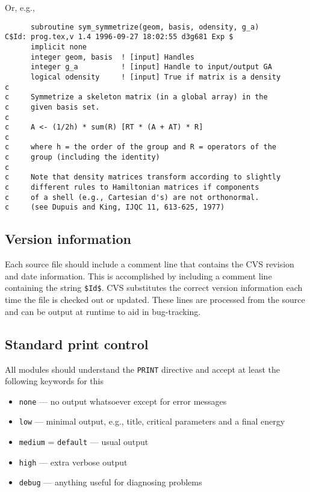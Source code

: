 Or, e.g.,
\begin{verbatim}
      subroutine sym_symmetrize(geom, basis, odensity, g_a)
C$Id: prog.tex,v 1.4 1996-09-27 18:02:55 d3g681 Exp $
      implicit none
      integer geom, basis  ! [input] Handles
      integer g_a          ! [input] Handle to input/output GA
      logical odensity     ! [input] True if matrix is a density
c
c     Symmetrize a skeleton matrix (in a global array) in the
c     given basis set.
c
c     A <- (1/2h) * sum(R) [RT * (A + AT) * R]
c
c     where h = the order of the group and R = operators of the
c     group (including the identity)
c
c     Note that density matrices transform according to slightly
c     different rules to Hamiltonian matrices if components
c     of a shell (e.g., Cartesian d's) are not orthonormal.
c     (see Dupuis and King, IJQC 11, 613-625, 1977)
\end{verbatim}


\subsection{Version information}

Each source file should include a comment line that contains the CVS
revision and date information.  This is accomplished by including a
comment line containing the string \verb+$+\verb+Id+\verb+$+.  CVS
substitutes the correct version information each time the file is
checked out or updated.  These lines are processed from the source and can be
output at runtime to aid in bug-tracking.

\subsection{Standard print control}

All modules should understand the \verb+PRINT+ directive and
accept at least the following keywords for this
\begin{itemize}
\item \verb+none+ --- no output whatsoever except for error messages
\item \verb+low+ --- minimal output, e.g., title, critical parameters
and a final energy
\item \verb+medium+ = \verb+default+ --- usual output
\item \verb+high+ --- extra verbose output
\item \verb+debug+ --- anything useful for diagnosing problems
\end{itemize}

